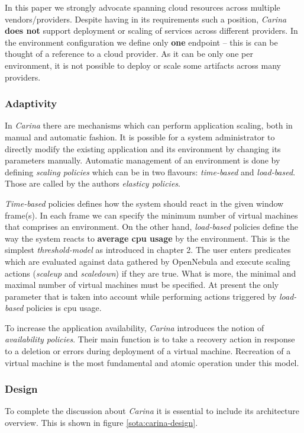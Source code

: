 In this paper we strongly advocate spanning cloud resources across multiple vendors/providers. Despite having in its requirements such a position, \emph{Carina} \textbf{does not} support deployment or scaling of services across different providers. In the environment configuration we define only \textbf{one} endpoint -- this is can be thought of a reference to a cloud provider. As it can be only one per environment, it is not possible to deploy or scale some artifacts across many providers.
\subsubsection{Adaptivity}
In \emph{Carina} there are mechanisms which can perform application scaling, both in manual and automatic fashion. It is possible for a system administrator to directly modify the existing application and its environment by changing its parameters manually. Automatic management of an environment is done by defining \emph{scaling policies} which can be in two flavours: \emph{time-based} and \emph{load-based}. Those are called by the authors \emph{elasticy policies}.

\emph{Time-based} policies defines how the system should react in the given window frame(s). In each frame we can specify the minimum number of virtual machines that comprises an environment. On the other hand, \emph{load-based} policies define the way the system reacts to \textbf{average cpu usage} by the environment. This is the simplest \emph{threshold-model} as introduced in chapter 2. The user enters predicates which are evaluated against data gathered by OpenNebula and execute scaling actions  (\emph{scaleup} and \emph{scaledown}) if they are true. What is more, the minimal and maximal number of virtual machines must be specified. At present the only parameter that is taken into account while performing actions triggered by \emph{load-based} policies is cpu usage.

To increase the application availability, \emph{Carina} introduces the notion of \emph{availability policies}. Their main function is to take a recovery action in response to a deletion or errors during deployment of a virtual machine. Recreation of a virtual machine is the most fundamental and atomic operation under this model.

\subsubsection{Design}
To complete the discussion about \emph{Carina} it is essential to include its architecture overview. This is shown in figure \ref{sota:carina-design}.

